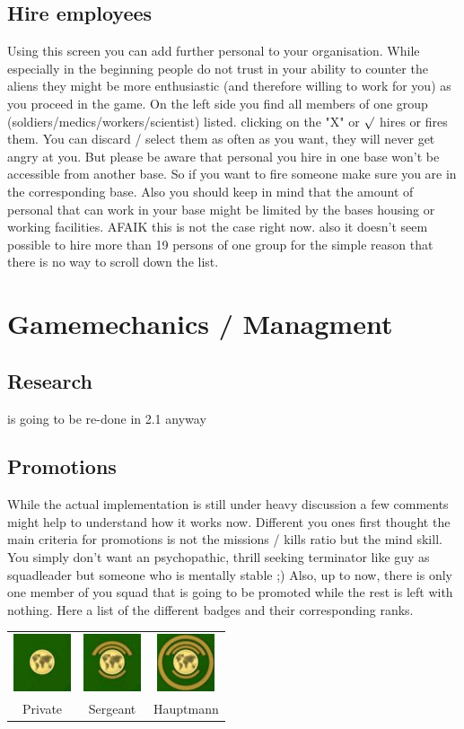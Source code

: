 \subsection{Hire employees}
Using this screen you can add further personal to your organisation. While especially in the beginning people do not trust in your ability to counter the aliens they might be more enthusiastic (and therefore willing to work for you) as you proceed in the game. On the left side you find all members of one group (soldiers/medics/workers/scientist) listed. clicking on the "X" or $\surd$ hires or fires them. You can discard / select them as often as you want, they will never get angry at you. But please be aware that personal you hire in one base won't be accessible from another base. So if you want to fire someone make sure you are in the corresponding base. Also you should keep in mind that the amount of personal that can work in your base might be limited by the bases housing or working facilities. AFAIK this is not the case right now. also it doesn't seem possible to hire more than 19 persons of one group for the simple reason that there is no way to scroll down the list.

\section{Gamemechanics / Managment}
\subsection{Research}
is going to be re-done in 2.1 anyway
\subsection{Promotions}
While the actual implementation is still under heavy discussion a few comments might help to understand how it works now. Different you ones first thought the main criteria for promotions is not the missions / kills ratio but the mind skill. You simply don't want an psychopathic, thrill seeking terminator like guy as squadleader but someone who is mentally stable ;) Also, up to now, there is only one member of you squad that is going to be promoted while the rest is left with nothing.
Here a list of the different badges and their corresponding ranks.

\begin{tabular}{ccc}
\includegraphics[scale=1]{images/badges_rekrut_final.jpg} & \includegraphics[scale=1]{images/badges_sergeant_final.jpg} & \includegraphics[scale=1]{images/badges_hauptmann_final.jpg}\\
Private & Sergeant & Hauptmann\\
\end{tabular} 
